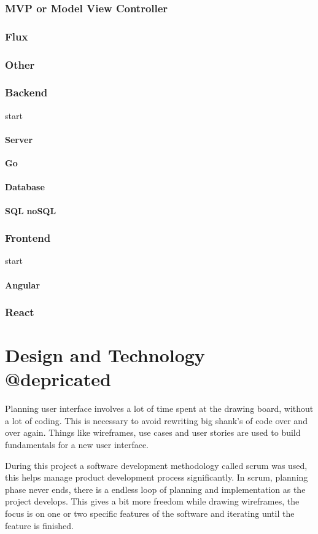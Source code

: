 \subsection{MVP or Model View Controller}

\subsection{Flux}

\subsection{Other}

\subsection{Backend}
start
\subsubsection{Server}
\textbf{Go}
\subsubsection{Database}
\textbf{SQL}
\textbf{noSQL}
\subsection{Frontend}
start
\subsubsection{Angular}
\subsection{React}

\chapter{Design and Technology @depricated}
Planning user interface involves a lot of time spent at the drawing board, without a lot of coding. This is necessary to avoid rewriting big shank's of code over and over again. Things like wireframes, use cases and user stories are used to build fundamentals for a new user interface.

During this project a software development methodology called scrum was used, this helps manage product development process significantly. In scrum, planning phase never ends, there is a endless loop of planning and implementation as the project develops. This gives a bit more freedom while drawing wireframes, the focus is on one or two specific features of the software and iterating until the feature is finished.\\\\
